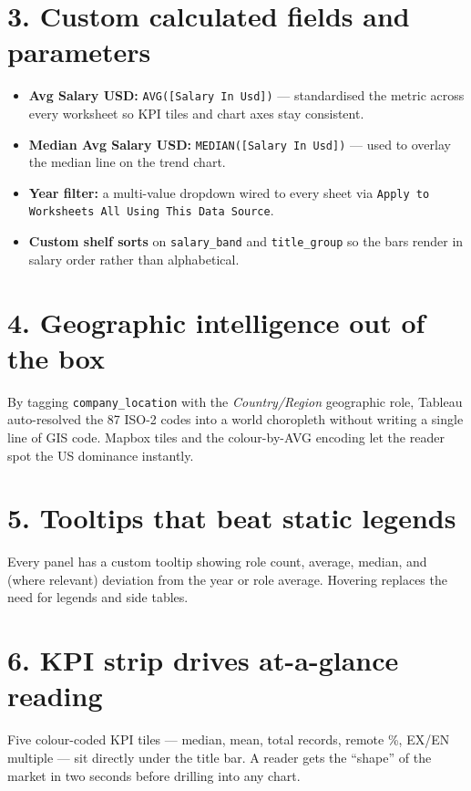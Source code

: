 \documentclass[11pt,a4paper,oneside]{report}
\begin{document}
\section{3. Custom calculated fields and parameters}
\begin{itemize}[leftmargin=*]
    \item \textbf{Avg Salary USD:} \texttt{AVG([Salary In Usd])} --- standardised the metric across every worksheet so KPI tiles and chart axes stay consistent.
    \item \textbf{Median Avg Salary USD:} \texttt{MEDIAN([Salary In Usd])} --- used to overlay the median line on the trend chart.
    \item \textbf{Year filter:} a multi-value dropdown wired to every sheet via \texttt{Apply to Worksheets All Using This Data Source}.
    \item \textbf{Custom shelf sorts} on \texttt{salary\_band} and \texttt{title\_group} so the bars render in salary order rather than alphabetical.
\end{itemize}

\section{4. Geographic intelligence out of the box}
By tagging \texttt{company\_location} with the \textit{Country/Region} geographic role, Tableau auto-resolved the 87 ISO-2 codes into a world choropleth without writing a single line of GIS code. Mapbox tiles and the colour-by-AVG encoding let the reader spot the US dominance instantly.

\section{5. Tooltips that beat static legends}
Every panel has a custom tooltip showing role count, average, median, and (where relevant) deviation from the year or role average. Hovering replaces the need for legends and side tables.

\section{6. KPI strip drives at-a-glance reading}
Five colour-coded KPI tiles --- median, mean, total records, remote \%, EX/EN multiple --- sit directly under the title bar. A reader gets the ``shape'' of the market in two seconds before drilling into any chart.
\end{document}
